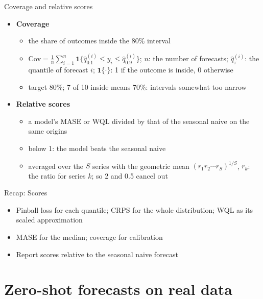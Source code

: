\begin{frame}{Coverage and relative scores}
\itemsize{\small}
\begin{itemize}
    \item \textbf{Coverage}
    \begin{itemize}
        \item the share of outcomes inside the 80\% interval
        \item $\text{Cov} = \frac1n\sum_{i=1}^{n} \mathbf{1}\{\hat q_{0.1}^{(i)} \le y_i \le \hat q_{0.9}^{(i)}\}$; $n$: the number of forecasts; $\hat q_{\tau}^{(i)}$: the quantile of forecast $i$; $\mathbf{1}\{\cdot\}$: 1 if the outcome is inside, 0 otherwise
        \item target 80\%; 7 of 10 inside means 70\%: intervals somewhat too narrow
    \end{itemize}
    \item \textbf{Relative scores}
    \begin{itemize}
        \item a model's MASE or WQL divided by that of the seasonal naive on the same origins
        \item below 1: the model beats the seasonal naive
        \item averaged over the $S$ series with the geometric mean $(r_1 r_2 \cdots r_S)^{1/S}$, $r_k$: the ratio for series $k$; so 2 and 0.5 cancel out
    \end{itemize}
\end{itemize}
\end{frame}

\begin{frame}{Recap: Scores}
\itemsize{\small}
\begin{itemize}
    \item Pinball loss for each quantile; CRPS for the whole distribution; WQL as its scaled approximation
    \item MASE for the median; coverage for calibration
    \item Report scores relative to the seasonal naive forecast
\end{itemize}
\end{frame}


\section{Zero-shot forecasts on real data}

